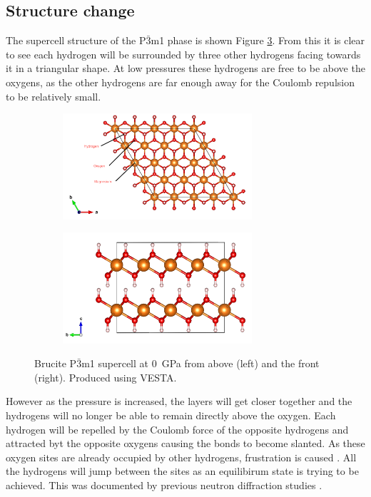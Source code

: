 \documentclass[a4paper,12pt]{article}
\begin{document}
\subsection{Structure change}
The supercell structure of the P$\bar{3}$m1 phase is shown Figure \ref{Fig3}. From this it is clear to see each hydrogen will be surrounded by three other hydrogens facing towards it in a triangular shape. At low pressures these hydrogens are free to be above the oxygens, as the other hydrogens are far enough away for the Coulomb repulsion to be relatively small.
\begin{figure}[h!!!!]
	\centering
	\begin{subfigure}[t]{0.5\textwidth}
		\centering
		\includegraphics[width=7cm]{figures/p3m1_p0_supercell_top.png}
		\label{Fig3a}
	\end{subfigure}%
	\begin{subfigure}[t]{0.5\textwidth}
		\centering
		\includegraphics[width=7cm]{figures/p3m1_p0_supercell_front.png}
		\label{Fig3b}
	\end{subfigure}
	\caption{Brucite P$\bar{3}$m1 supercell at \SI{0}{\GPa} from above (left) and the front (right). Produced using VESTA.}
	\label{Fig3}
\end{figure}
However as the pressure is increased, the layers will get closer together and the hydrogens will no longer be able to remain directly above the oxygen. Each hydrogen will be repelled by the Coulomb force of the opposite hydrogens and attracted byt the opposite oxygens causing the bonds to become slanted. As these oxygen sites are already occupied by other hydrogens, frustration is caused \cite{RaugeiKey}. All the hydrogens will jump between the sites as an equilibirum state is trying to be achieved. This was documented by previous neutron diffraction studies \cite{PressHBond, Catti1995}. 
\end{document}
